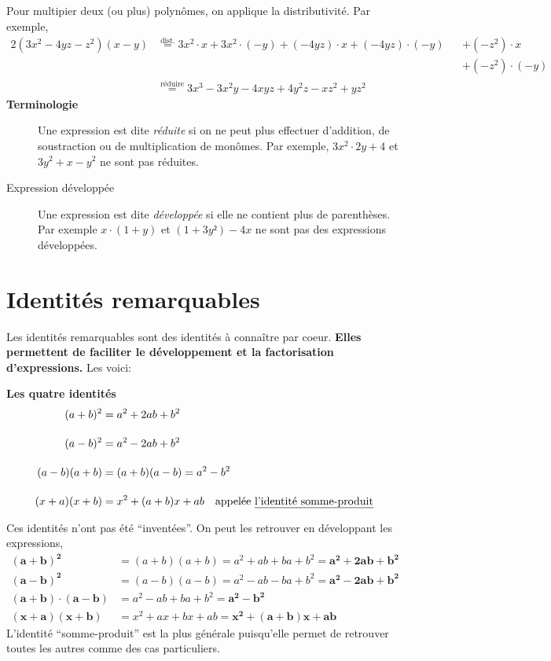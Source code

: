 \documentclass[a4paper,12pt]{report}
\begin{document}
Pour multipier deux (ou plus) polynômes, on applique la distributivité. Par exemple, 
\begin{alignat*}{2}
	(3x^2-4yz-z^2)(x-y)&\stackrel{\text{dist.}}{=}3x^2\cdot x+3x^2\cdot (-y)+(-4yz)\cdot x+(-4yz)\cdot (-y)&&+(-z^2)\cdot x\\&&&+(-z^2)\cdot (-y)\\
			   &\stackrel{\text{réduire}}{=}3x^3-3x^2y-4xyz+4y^2z-xz^2+yz^2&&
\end{alignat*}
{\bfseries Terminologie} 
\begin{description}
	\item[] Une expression est dite \emph{réduite} si on ne peut plus effectuer d'addition, de soustraction ou de multiplication de monômes. Par exemple, $3x^2\cdot 2y+4$ et $3y^2+x-y^2$ ne sont pas réduites.
	
	\item[Expression développée] Une expression est dite \emph{développée} si elle ne contient plus de parenthèses. Par exemple $x\cdot (1+y)$ et $(1+3y²)-4x$ ne sont pas des expressions développées.
\end{description}

\section{Identités remarquables}
Les identités remarquables sont des identités à connaître par coeur. {\bfseries Elles permettent de faciliter le développement et la factorisation d'expressions.}
Les voici:

\begin{center}
{\bfseries Les quatre identités}
\begin{align}
	(a+b)^2&=a^2+2ab+b^2\\[1em]
	(a-b)^2&=a^2-2ab+b^2\\[1em]
	(a-b)(a+b)&=(a+b)(a-b)=a^2-b^2\\[1em]
	(x+a)(x+b)&=x^2+(a+b)x+ab \quad \text{appelée \emph{l'identité somme-produit}}
\end{align}
\end{center}
Ces identités n'ont pas été \enquote{inventées}.
On peut les retrouver en développant les expressions,
\begin{align*}
	\bm{(a+b)^2}&=(a+b)(a+b)=a^2+ab+ba+b^2=\bm{a^2+2ab+b^2}\\[1em]
	\bm{(a-b)^2}&=(a-b)(a-b)=a^2-ab-ba+b^2=\bm{a^2-2ab+b^2}\\[1em]
	\bm{(a+b)\cdot (a-b)}&=a^2-ab+ba+b^2=\bm{a^2-b^2}\\[1em]
	\bm{(x+a)(x+b)}&=x^2+ax+bx+ab=\bm{x^2+(a+b)x+ab}
\end{align*}
L'identité \enquote{somme-produit} est la plus générale puisqu'elle permet de retrouver toutes les autres comme des cas particuliers. 
\end{document}
